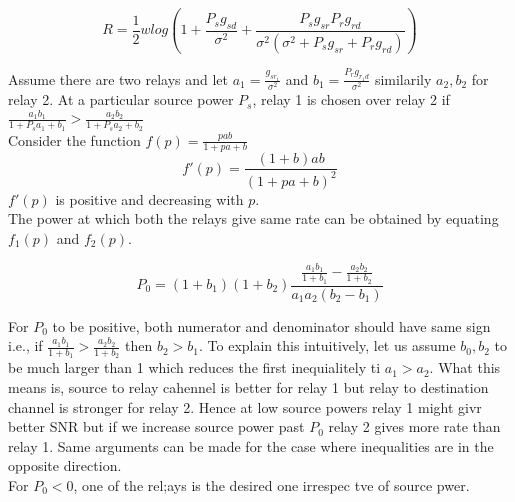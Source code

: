 \documentclass[titlepage]{article}
\begin{document}
\begin{equation}
R = \frac{1}{2} w log(1+\frac{P_s g_{sd}}{\sigma^2} +
\frac{P_s g_{sr} P_r g_{rd}}{\sigma^2(\sigma^2 + P_sg_{sr} + P_rg_{rd})})
\end{equation}

Assume there are two relays and let $a_1 = \frac{g_{sr_1}}{\sigma^2}$
and $b_1 = \frac{P_{r} g_{r_1 d}}{\sigma^2}$ similarily $a_2, b_2$ for relay 2.
At a particular source power $P_s$, relay 1 is chosen over relay 2
if $\frac{a_1b_1}{1+P_s a_1 + b_1} > \frac{a_2b_2}{1+P_s a_2 + b_2}
 $
\\
Consider the function $f(p) = \frac{pab}{1+p a + b} $ \\
\begin{equation}
f'(p) = \frac{(1+b)ab}{(1+pa+b)^2}
\end{equation}
$f'(p)$ is positive and decreasing with $p$. \\
The power at which both the relays give same rate can be obtained 
by equating $f_1(p)$ and $f_2(p)$.

\begin{equation}
	P_0 = (1+b_1)(1+b_2) \frac{\frac{a_1b_1}{1+b_1} - 
	\frac{a_2b_2}{1+b_2}}{a_1a_2(b_2-b_1)}
\end{equation}

For $P_0$ to be positive, both numerator and denominator should 
have same sign i.e., if 
$\frac{a_1b_1}{1+b_1} >	\frac{a_2b_2}{1+b_2}$ then $b_2 > b_1$.
	To explain this intuitively, let us assume $b_0,b_2$ to be 
	much larger than 1 which reduces the first inequialitely ti
	$a_1 > a_2$. What this means is, source to relay cahennel is 
	better for relay 1 but relay to destination channel is stronger
	for relay 2. Hence at low source powers relay 1 might givr
	better SNR but if we increase source power past $P_0$ relay 2 
	gives more rate than relay 1. Same arguments can be made 
	for the case where inequalities are in the opposite
	direction. 
	\\
	For $P_0 < 0$, one of the rel;ays is the desired one irrespec
	tve of source pwer.
\end{document}

